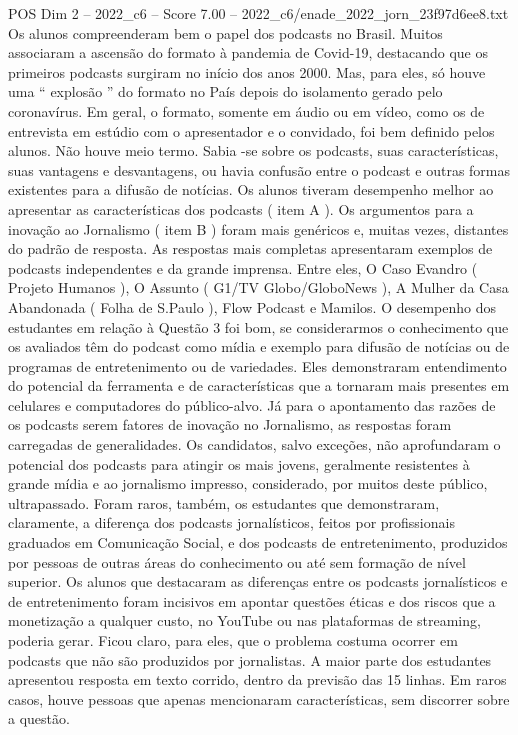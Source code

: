\begin{textsample}{POS Dim 2 – 2022\_c6 – Score 7.00 – 2022\_c6/enade\_2022\_jorn\_23f97d6ee8.txt}
Os alunos compreenderam bem o papel dos podcasts no Brasil.
Muitos associaram a ascensão do formato à pandemia de Covid-19, destacando que os primeiros podcasts surgiram no início dos anos 2000.
Mas, para eles, só houve uma “ explosão ” do formato no País depois do isolamento gerado pelo coronavírus.
Em geral, o formato, somente em áudio ou em vídeo, como os de entrevista em estúdio com o apresentador e o convidado, foi bem definido pelos alunos.
Não houve meio termo.
Sabia -se sobre os podcasts, suas características, suas vantagens e desvantagens, ou havia confusão entre o podcast e outras formas existentes para a difusão de notícias.
Os alunos tiveram desempenho melhor ao apresentar as características dos podcasts ( item A ).
Os argumentos para a inovação ao Jornalismo ( item B ) foram mais genéricos e, muitas vezes, distantes do padrão de resposta.
As respostas mais completas apresentaram exemplos de podcasts independentes e da grande imprensa.
Entre eles, O Caso Evandro ( Projeto Humanos ), O Assunto ( G1/TV Globo/GloboNews ), A Mulher da Casa Abandonada ( Folha de S.Paulo ), Flow Podcast e Mamilos.
O desempenho dos estudantes em relação à Questão 3 foi bom, se considerarmos o conhecimento que os avaliados têm do podcast como mídia e exemplo para difusão de notícias ou de programas de entretenimento ou de variedades.
Eles demonstraram entendimento do potencial da ferramenta e de características que a tornaram mais presentes em celulares e computadores do público-alvo.
Já para o apontamento das razões de os podcasts serem fatores de inovação no Jornalismo, as respostas foram carregadas de generalidades.
Os candidatos, salvo exceções, não aprofundaram o potencial dos podcasts para atingir os mais jovens, geralmente resistentes à grande mídia e ao jornalismo impresso, considerado, por muitos deste público, ultrapassado.
Foram raros, também, os estudantes que demonstraram, claramente, a diferença dos podcasts jornalísticos, feitos por profissionais graduados em Comunicação Social, e dos podcasts de entretenimento, produzidos por pessoas de outras áreas do conhecimento ou até sem formação de nível superior.
Os alunos que destacaram as diferenças entre os podcasts jornalísticos e de entretenimento foram incisivos em apontar questões éticas e dos riscos que a monetização a qualquer custo, no YouTube ou nas plataformas de streaming, poderia gerar.
Ficou claro, para eles, que o problema costuma ocorrer em podcasts que não são produzidos por jornalistas.
A maior parte dos estudantes apresentou resposta em texto corrido, dentro da previsão das 15 linhas.
Em raros casos, houve pessoas que apenas mencionaram características, sem discorrer sobre a questão.

\end{textsample}
